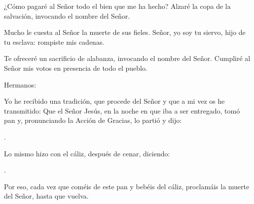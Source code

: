 
 


\begin{psbody}
¿Cómo pagaré al Señor 
todo el bien que me ha hecho? 
Alzaré la copa de la salvación, 
invocando el nombre del Señor. 

Mucho le cuesta al Señor 
la muerte de sus fieles. 
Señor, yo soy tu siervo, 
hijo de tu esclava: 
rompiste mis cadenas. 

Te ofreceré un sacrificio de alabanza, 
invocando el nombre del Señor. 
Cumpliré al Señor mis votos 
en presencia de todo el pueblo. 
\end{psbody}


 


\begin{scripture}
Hermanos: 

Yo he recibido una tradición, que procede del Señor y que a mi vez os he transmitido: Que el Señor Jesús, en la noche en que iba a ser entregado, tomó pan y, pronunciando la Acción de Gracias, lo partió y dijo: 

	
. 

Lo mismo hizo con el cáliz, después de cenar, diciendo: 

. 
	
Por eso, cada vez que coméis de este pan y bebéis del cáliz, proclamáis la muerte del Señor, hasta que vuelva.
\end{scripture}


\newpage 
{}

 


